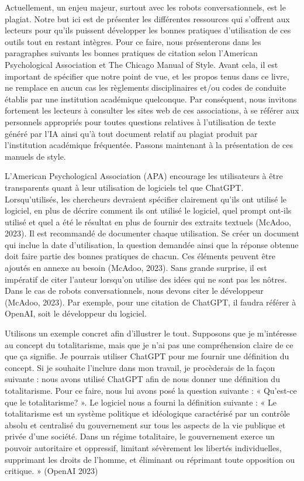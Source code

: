 \documentclass[
  letterpaper,
  DIV=11,
  numbers=noendperiod]{scrreprt}
\begin{document}
Actuellement, un enjeu majeur, surtout avec les robots conversationnels,
est le plagiat. Notre but ici est de présenter les différentes
ressources qui s'offrent aux lecteurs pour qu'ils puissent développer
les bonnes pratiques d'utilisation de ces outils tout en restant
intègres. Pour ce faire, nous présenterons dans les paragraphes suivants
les bonnes pratiques de citation selon l'American Psychological
Association et The Chicago Manual of Style. Avant cela, il est important
de spécifier que notre point de vue, et les propos tenus dans ce livre,
ne remplace en aucun cas les règlements disciplinaires et/ou codes de
conduite établis par une institution académique quelconque. Par
conséquent, nous invitons fortement les lecteurs à consulter les sites
web de ces associations, à se référer aux personnels appropriés pour
toutes questions relatives à l'utilisation de texte généré par l'IA
ainsi qu'à tout document relatif au plagiat produit par l'institution
académique fréquentée. Passons maintenant à la présentation de ces
manuels de style.

L'American Psychological Association (APA) encourage les utilisateurs à
être transparents quant à leur utilisation de logiciels tel que ChatGPT.
Lorsqu'utilisés, les chercheurs devraient spécifier clairement qu'ils
ont utilisé le logiciel, en plus de décrire comment ils ont utilisé le
logiciel, quel prompt ont-ils utilisé et quel a été le résultat en plus
de fournir des extraits textuels (McAdoo, 2023). Il est recommandé de
documenter chaque utilisation. Se créer un document qui inclue la date
d'utilisation, la question demandée ainsi que la réponse obtenue doit
faire partie des bonnes pratiques de chacun. Ces éléments peuvent être
ajoutés en annexe au besoin (McAdoo, 2023). Sans grande surprise, il est
impératif de citer l'auteur lorsqu'on utilise des idées qui ne sont pas
les nôtres. Dans le cas de robots conversationnels, nous devons citer le
développeur (McAdoo, 2023). Par exemple, pour une citation de ChatGPT,
il faudra référer à OpenAI, soit le développeur du logiciel.

Utilisons un exemple concret afin d'illustrer le tout. Supposons que je
m'intéresse au concept du totalitarisme, mais que je n'ai pas une
compréhension claire de ce que ça signifie. Je pourrais utiliser ChatGPT
pour me fournir une définition du concept. Si je souhaite l'inclure dans
mon travail, je procèderais de la façon suivante : nous avons utilisé
ChatGPT afin de nous donner une définition du totalitarisme. Pour ce
faire, nous lui avons posé la question suivante : « Qu'est-ce que le
totalitarisme? ». Le logiciel nous a fourni la définition suivante : «
Le totalitarisme est un système politique et idéologique caractérisé par
un contrôle absolu et centralisé du gouvernement sur tous les aspects de
la vie publique et privée d'une société. Dans un régime totalitaire, le
gouvernement exerce un pouvoir autoritaire et oppressif, limitant
sévèrement les libertés individuelles, supprimant les droits de l'homme,
et éliminant ou réprimant toute opposition ou critique. » (OpenAI 2023)
\end{document}

